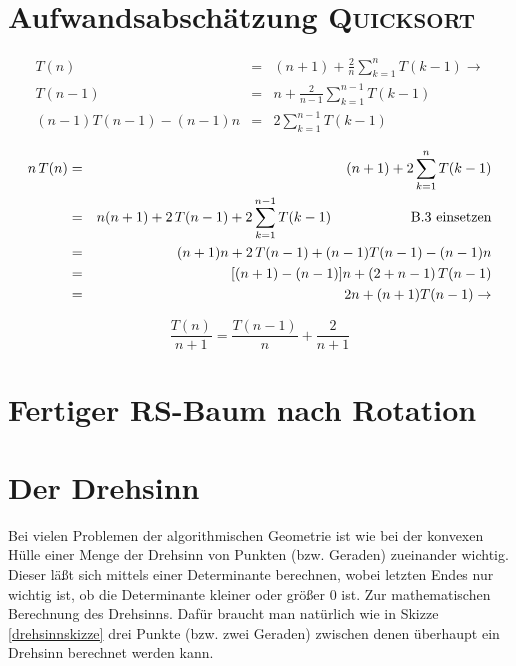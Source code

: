 \documentclass[ngerman]{scrreprt}%
\theoremstyle{break}
\begin{document}
\section{Aufwandsabschätzung \textsc{Quicksort}}
\label{quicksort}

\begin{eqnarray}
T(n) & = & (n+1)+ \frac{2}{n} \sum_{k=1}^nT(k-1) \rightarrow\\
T(n-1) & = & n+\frac{2}{n-1} \sum_{k=1}^{n-1}T(k-1)\\
(n-1)T(n-1) - (n-1)n & = & 2\sum_{k=1}^{n-1}T(k-1)
\end{eqnarray}

\begin{eqnarray*}
n\,T(n) & = & (n+1)+ 2 \sum_{k=1}^nT(k-1)\\
& = & n(n+1)+2\,T(n-1) +2 \sum_{k=1}^{n-1}T(k-1) \hspace{2cm} \textup{B.3 einsetzen}\\
& = & (n+1)n+2\,T(n-1) + (n-1)T(n-1) -(n-1)n\\
& = & [(n+1)-(n-1)]n+(2+n-1)\,T(n-1)\\
& = & 2n+(n+1)T(n-1) \rightarrow 
\end{eqnarray*}

\begin{displaymath}
\frac{T(n)}{n+1}= \frac{T(n-1)}{n}+ \frac{2}{n+1}	
\end{displaymath}

\section{Fertiger RS-Baum nach Rotation}
\label{rsrotation}
\begin{figure}[H]
\centering


\end{figure}

\section{Der Drehsinn} \label{drehsinn}
Bei vielen Problemen der algorithmischen Geometrie ist wie bei der konvexen Hülle einer Menge der Drehsinn von Punkten (bzw. Geraden) zueinander wichtig.
Dieser läßt sich mittels einer Determinante berechnen, wobei letzten Endes nur wichtig ist, ob die Determinante kleiner oder größer
0 ist. Zur
mathematischen Berechnung des Drehsinns. Dafür braucht man natürlich wie in Skizze
\autoref{drehsinnskizze} drei Punkte (bzw. zwei Geraden) zwischen denen überhaupt ein Drehsinn berechnet werden kann.
\end{document}
